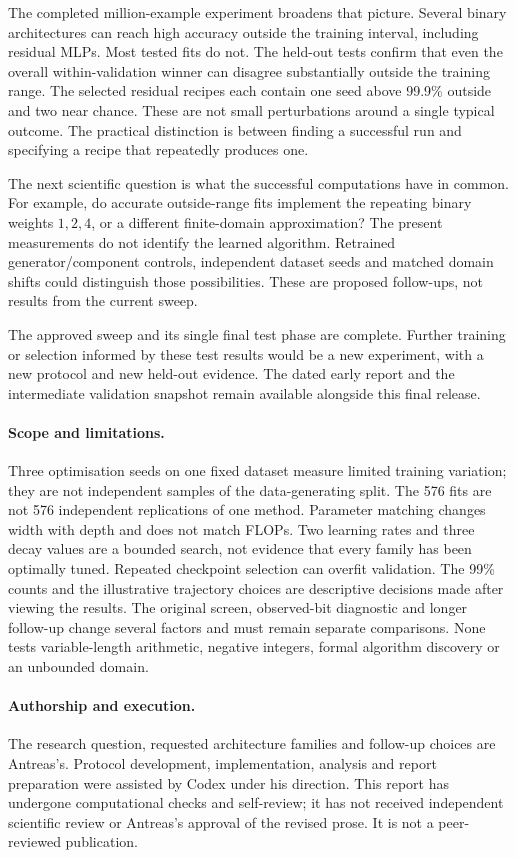 \documentclass{article}
\begin{document}
The completed million-example experiment broadens that picture. Several binary architectures
can reach high accuracy outside the training interval, including residual MLPs.
Most tested fits do not. The held-out tests confirm that even the overall
within-validation winner can disagree substantially outside the training range.
The selected residual recipes each contain one seed above 99.9\% outside and two
near chance. These are not small perturbations around a single typical outcome.
The practical distinction is between finding a successful run and specifying a
recipe that repeatedly produces one.

The next scientific question is what the successful computations have in common.
For example, do accurate outside-range fits implement the repeating binary weights
$1,2,4$, or a different finite-domain approximation? The present measurements do
not identify the learned algorithm. Retrained generator/component controls,
independent dataset seeds and matched domain shifts could distinguish those
possibilities. These are proposed follow-ups, not results from the current sweep.

The approved sweep and its single final test phase are complete. Further training
or selection informed by these test results would be a new experiment, with a new
protocol and new held-out evidence. The dated early report and the intermediate
validation snapshot remain available alongside this final release.

\paragraph{Scope and limitations.}
Three optimisation seeds on one fixed dataset measure limited training variation;
they are not independent samples of the data-generating split. The 576 fits are
not 576 independent replications of one method. Parameter matching changes width
with depth and does not match FLOPs. Two learning rates and three decay values
are a bounded search, not evidence that every family has been optimally tuned.
Repeated checkpoint selection can overfit validation. The 99\% counts and the
illustrative trajectory choices are descriptive decisions made after viewing the
results. The original screen, observed-bit diagnostic and longer follow-up change
several factors and must remain separate comparisons. None tests variable-length
arithmetic, negative integers, formal algorithm discovery or an unbounded domain.

\paragraph{Authorship and execution.}
The research question, requested architecture families and follow-up choices are
Antreas's. Protocol development, implementation, analysis and report preparation
were assisted by Codex under his direction. This report has undergone computational
checks and self-review; it has not received independent scientific review or
Antreas's approval of the revised prose. It is not a peer-reviewed publication.
\end{document}
